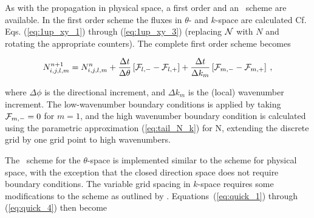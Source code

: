\vspace{\baselineskip} \noindent 
As with the propagation in physical space, a first order and an \uq\ scheme
are available. In the first order scheme the fluxes in $\theta$- and $k$-space
are calculated Cf. Eqs. (\ref{eq:1up_xy_1}) through (\ref{eq:1up_xy_3})
(replacing ${\cal N}$ with $N$ and rotating the appropriate counters). The complete
first order scheme becomes


\begin{equation}
N_{i,j,l,m}^{n+1} = N_{i,j,l,m}^n 
 + \frac{\Delta t}{\Delta \theta} \left [ {\cal F}_{l,-} - {\cal F}_{l,+} \right ]
 + \frac{\Delta t}{\Delta k_m} \left [ {\cal F}_{m,-} - {\cal F}_{m,+} \right ]
\: , \label{eq:1up_intra_tot} \end{equation}

\noindent
where $\Delta \phi$ is the directional increment, and $\Delta k_m$ is the
(local) wavenumber increment. The low-wavenumber boundary conditions is
applied by taking ${\cal F}_{m,-}=0$ for $m=1$, and the high wavenumber boundary
condition is calculated using the parametric approximation (\ref{eq:tail_N_k})
for N, extending the discrete grid by one grid point to high wavenumbers.

\vspace{\baselineskip} \noindent
The \uq\ scheme for the $\theta$-space is implemented similar to the scheme
for physical space, with the exception that the closed direction space does
not require boundary conditions. The variable grid spacing in $k$-space
requires some modifications to the scheme as outlined by
\cite[{Appendix}]{art:Leo79}. Equations~(\ref{eq:quick_1}) through
(\ref{eq:quick_4}) then become


